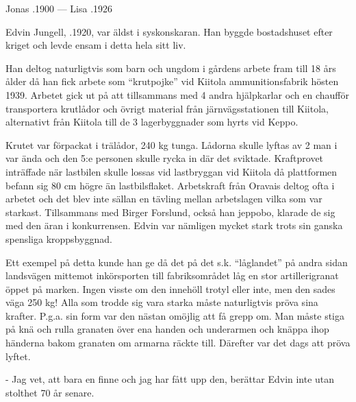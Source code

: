 Jonas .1900  ---   Lisa .1926






Edvin Jungell, .1920, var äldst i syskonskaran. Han byggde bostadshuset efter kriget och levde ensam i detta hela sitt liv.

Han deltog naturligtvis som barn och ungdom i gårdens arbete fram till 18 års ålder då han fick arbete som ``krutpojke'' vid Kiitola ammunitionsfabrik hösten 1939. Arbetet gick ut på att tillsammans med 4 andra hjälpkarlar och en chaufför transportera krutlådor och övrigt material från järnvägsstationen till Kiitola, alternativt från Kiitola till de 3 lagerbyggnader som hyrts vid Keppo.

Krutet var förpackat i trälådor, 240 kg tunga. Lådorna skulle lyftas av 2 man i var ända och den 5:e personen skulle rycka in där det sviktade. Kraftprovet inträffade när lastbilen skulle lossas vid lastbryggan vid Kiitola då plattformen befann sig 80 cm högre än lastbilsflaket. Arbetskraft från Oravais deltog ofta i arbetet och det blev inte sällan en tävling mellan arbetslagen vilka som var starkast. Tillsammans med Birger Forslund, också han jeppobo, klarade de sig med den äran i konkurrensen. Edvin var nämligen mycket stark trots sin ganska spensliga kroppsbyggnad.

Ett exempel på detta kunde han ge då det på det s.k. ``låglandet'' på andra sidan landsvägen mittemot inkörsporten till fabriksområdet låg en stor artillerigranat öppet på marken. Ingen visste om den innehöll trotyl eller inte, men den sades väga 250 kg! Alla som trodde sig vara starka måste naturligtvis pröva sina krafter. P.g.a. sin form var den nästan omöjlig att få grepp om. Man måste stiga på knä och rulla granaten över ena handen och underarmen och knäppa ihop händerna bakom granaten om armarna räckte till. Därefter var det dags att pröva lyftet.

- Jag vet, att bara en finne och jag har fått upp den, berättar Edvin inte utan stolthet 70 år senare.

